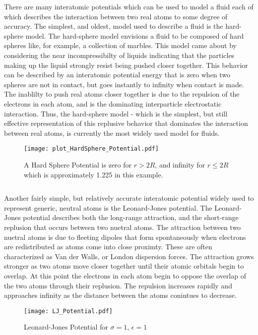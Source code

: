 \documentclass[12pt]{article}
\begin{document}
There are many interatomic potentials which can be used to model a fluid each of which describes the interaction between two real atoms to some degree of accuracy. The simplest, and oldest, model used to describe a fluid is the hard-sphere model. The hard-sphere model envisions a fluid to be composed of hard spheres like, for example, a collection of marbles. This model came about by considering the near incompressibilty of liquids indicating that the particles making up the liquid strongly resist being pushed closer together. This behavior can be described by an interatomic potential energy that is zero when two spheres are not in contact, but goes instantly to infinity when contact is made. The inablilty to push real atoms closer together is due to the repulsion of the electrons in each atom, and is the dominating interparticle electrostatic interaction. Thus, the hard-sphere model - which is the simplest, but still effective representation of this replusive behavior that dominates the interaction between real atoms, is currently the most widely used model for fluids.

\begin{figure}[h!]
    \centering
    \texttt{[image: plot\_HardSphere\_Potential.pdf]}
    \caption{A Hard Sphere Potential is zero for $r>2R$, and infinity for $r\leq{2R}$ which is approximately 1.225 in this example.}
    \label{fig:HardSphere_potential}
  \end{figure}
\[{}\]
\[{}\]
\[{}\]
\[{}\]

Another fairly simple, but relatively accurate interatomic potential widely used to represent generic, neutral atoms is the Leonard-Jones potential. The Leonard-Jones potential describes both the long-range attraction, and the short-range replusion that occurs between two nuetral atoms. The attraction between two nuetral atoms is due to fleeting dipoles that form spontaneously when electrons are redistributed as atoms come into close proximty. These are often characterized as Van der Walls, or London dispersion forces. The attraction grows stronger as two atoms move closer together until their atomic orbitals begin to overlap. %
 At this point the electrons in each atom begin to oppose the overlap of the two atoms through their replusion. The repulsion increases rapidly and approaches infinity as the distance between the atoms conintues to decrease.  
 
\begin{figure}[h!]
    \centering
    \texttt{[image: LJ\_Potential.pdf]}
    \caption{Leonard-Jones Potential for $\sigma=1$, $\epsilon=1$}
    \label{fig:LJ_potential}
  \end{figure}
\end{document}
